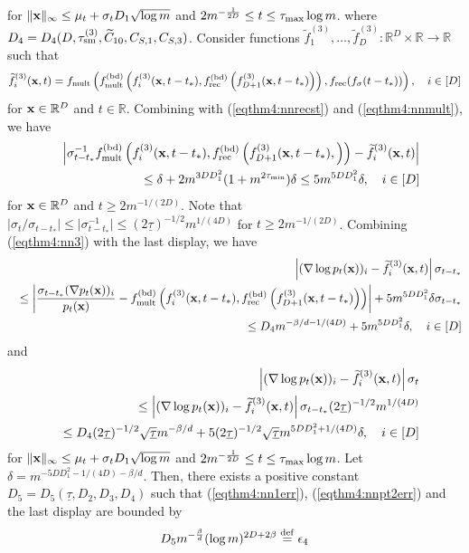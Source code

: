 \documentclass[twoside,11pt]{article}
\newcommand{\bx}{{\bf x}}
\newcommand{\bbR}{{\mathbb R}}
\newcommand{\be}{\begin{equation}}
\newcommand{\ee}{\end{equation}}
\newcommand{\bean}{\setlength\arraycolsep{1pt}\begin{eqnarray*}}
\newcommand{\eean}{\end{eqnarray*}}
\def\defeq{ \stackrel{\rm def}{=} }
\begin{document}
for $\|\bx\|_{\infty} \leq  \mu_t + \sigma_t D_{1} \sqrt{\log m}$ and $2 m^{-\frac{1}{2D}} \leq t \leq \tau_{\rm max}  \log m$.
where $D_{4} = D_{4} (D, \tau_{\rm sm}^{(3)}, \widetilde C_{10}, C_{S,1}, C_{S,3} ) $.
Consider functions $\widetilde f_{1}^{(3)},\ldots,\widetilde f_{D}^{(3)} : \bbR^{D} \times \bbR \to \bbR$ such that
\bean
\widetilde f^{(3)}_{i}(\bx,t) =  f_{\rm mult} \left( f_{{\rm mult}}^{(\rm bd)} \left( f_i^{(3)}(\bx,t - t_*) ,  f_{\rm rec}^{(\rm bd)}\left(f_{D+1}^{(3)}(\bx,t - t_*) \right) \right) , f_{\rm rec} ( f_{\sigma}(t - t_* )) \right), \quad i \in [D]
\eean
for $\bx \in \bbR^{D}$ and $t \in \bbR$.
Combining with (\ref{eqthm4:nnrecst}) and (\ref{eqthm4:nnmult}), we have
\bean
&& \left\vert \sigma_{t - t_*}^{-1} f_{{\rm mult}}^{(\rm bd)} \left( f_i^{(3)}(\bx,t - t_*) ,  f_{\rm rec}^{(\rm bd)}\left(f_{D+1}^{(3)}(\bx,t - t_*), \right) \right) - \widetilde f^{(3)}_{i}(\bx,t) \right\vert
\\
&& \leq \delta +  2  m^{3DD_{1}^2} (1+  m^{2\tau_{\rm min}}) \delta \leq 5 m^{5D D_{1}^2} \delta, \quad i \in [D]
\eean
for $\bx \in \bbR^{D}$ and $t \geq 2m^{-1/(2D)}$.
Note that $\vert \sigma_{t} / \sigma_{t-t_*} \vert \leq \vert \sigma_{t-t_*}^{-1} \vert \leq (2\underline{\tau})^{-1/2} m^{1/(4D) }$ for $t \geq 2m^{-1/(2D)}$.
Combining (\ref{eqthm4:nn3}) with the last display, we have
\bean
&& \left\vert (\nabla \log p_t(\bx))_{i} - \widetilde f_{i}^{(3)}(\bx,t)  \right\vert \sigma_{t - t_*} 
\\
&& \leq \left\vert \frac{\sigma_{t - t_*} (\nabla p_t(\bx))_{i}}{p_t(\bx)} - f_{{\rm mult}}^{(\rm bd)} \left( f_i^{(3)}(\bx,t - t_*) ,  f_{\rm rec}^{(\rm bd)}\left(f_{D+1}^{(3)}(\bx,t - t_*) \right) \right)  \right\vert + 5 m^{5D D_{1}^2} \delta\sigma_{t - t_*}
\\
&& \leq D_{4}  m^{-\beta/d -1/(4D)}+  5 m^{5D D_{1}^2} \delta, \quad i \in [D]
\eean
and
\bean
&&  \left\vert (\nabla \log p_t(\bx))_{i} - \widetilde f_{i}^{(3)}(\bx,t)  \right\vert \sigma_{t}
\\
&& \leq  \left\vert (\nabla \log p_t(\bx))_{i} - \widetilde f_{i}^{(3)}(\bx,t)  \right\vert  \sigma_{t - t_*}  (2\underline{\tau})^{-1/2} m^{1/(4D) }
\\
&& \leq D_{4} (2\underline{\tau})^{-1/2}  \sqrt{\underline{\tau}} m^{-\beta/d }
+ 5 (2\underline{\tau})^{-1/2}  \sqrt{\underline{\tau}} m^{5 D D_{1}^2 + 1/(4D)} \delta, \quad i \in [D]
\eean
for $\|\bx\|_{\infty} \leq  \mu_t + \sigma_t D_{1} \sqrt{\log m}$ and $2 m^{-\frac{1}{2D}} \leq t \leq \tau_{\rm max}  \log m$.
Let $\delta = m^{-5 D D_{1}^2 - 1/(4D) - \beta/d}$.
Then, there exists a positive constant $D_{5} = D_{5}(\underline{\tau}, D_{2},D_{3},D_{4})$ such that (\ref{eqthm4:nn1err}), (\ref{eqthm4:nnpt2err}) and the last display are bounded by
\be
D_{5} m^{-\frac{\beta}{d}} (\log m)^{ 2D+2\beta } \defeq \epsilon_{4} \label{eqthm4:nnerrtot}
\ee
\end{document}
